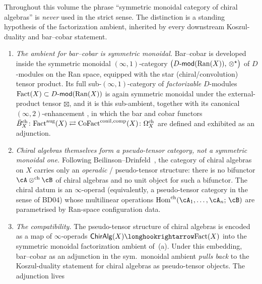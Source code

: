 \begin{remark}
\label{rem:bar-cobar-ambient-clarification}
Throughout this volume the phrase ``symmetric monoidal category of
chiral algebras'' is \emph{never} used in the strict sense. The
distinction is a standing hypothesis of the factorization ambient,
inherited by every downstream Koszul-duality and bar--cobar statement.
\begin{enumerate}[label=\textup{(\alph*)}]
\item \emph{The ambient for bar--cobar is symmetric monoidal.}
 Bar--cobar is developed inside the symmetric monoidal
 $(\infty,1)$-category $\bigl(D\text{-}\mathsf{mod}(\mathrm{Ran}(X)),\, \otimes^{\star}\bigr)$
 of $D$-modules on the Ran space, equipped with the star
 (chiral/convolution) tensor product. Its full sub-$(\infty,1)$-category
 of \emph{factorizable} $D$-modules $\mathrm{Fact}(X) \subset D\text{-}\mathsf{mod}(\mathrm{Ran}(X))$
 is again symmetric monoidal under the external-product tensor
 $\boxtimes$, and it is this sub-ambient, together with its
 canonical $(\infty,2)$-enhancement \cite[IV.5]{GR17}, in which the
 bar and cobar functors
 \(
 \bar{B}^{\mathrm{ch}}_X \colon \mathrm{Fact}^{\mathrm{aug}}(X)
 \rightleftarrows \mathrm{CoFact}^{\mathrm{conil,comp}}(X)
 \colon \Omega^{\mathrm{ch}}_X
 \)
 are defined and exhibited as an adjunction.
\item \emph{Chiral algebras themselves form a pseudo-tensor
 category, not a symmetric monoidal one.}
 Following Beilinson--Drinfeld~\cite[\S 1.1, \S 3.4]{BD04}, the
 category of chiral algebras on $X$ carries only an
 \emph{operadic} / pseudo-tensor structure:
 there is no bifunctor
 $\cA \otimes^{\mathrm{ch}} \cB$ of chiral algebras and no unit
 object for such a bifunctor. The chiral datum is an
 $\infty$-operad (equivalently, a pseudo-tensor category in the
 sense of BD04) whose multilinear operations
 $\Hom^{\mathrm{ch}}(\cA_1,\dots,\cA_n;\,\cB)$ are parametrised by
 Ran-space configuration data.
\item \emph{The compatibility.}
 The pseudo-tensor structure of chiral algebras is encoded as a
 map of $\infty$-operads
 \(
 \mathsf{ChirAlg}(X) \longhookrightarrow \Fact(X)
 \)
 into the symmetric monoidal factorization ambient of~(a). Under
 this embedding, bar--cobar as an adjunction in the sym.\ monoidal
 ambient \emph{pulls back} to the Koszul-duality statement for
 chiral algebras as pseudo-tensor objects. The adjunction lives

\end{enumerate}
\end{remark}
